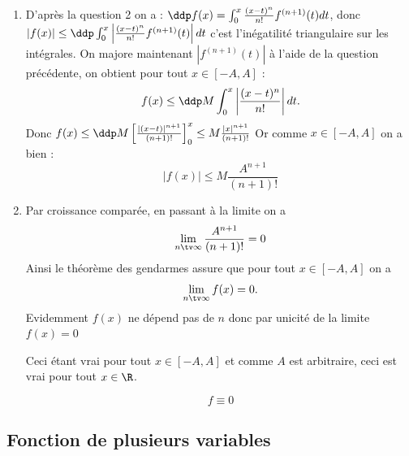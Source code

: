 \begin{correction}
\begin{enumerate}
\begin{enumerate}
\item  D'après la question 2 on a : 
$\ddp f(x) = \int_0^x \frac{(x-t)^n}{n!} f^{(n+1)} (t) dt$, donc $|f(x)| \leq\ddp   \int_0^x \left|  \frac{(x-t)^n}{n!} f^{(n+1)} (t) \right| dt$ c'est l'inégatilité triangulaire sur les intégrales. On majore maintenant $\left|  f^{(n+1)} (t) \right| $ à l'aide de la question précédente, on obtient pour tout $x\in [-A,A]$ :
$$f(x) \leq  \ddp M  \int_0^x \left|  \frac{(x-t)^n}{n!}  \right| dt.$$
Donc $f(x) \leq \ddp M \left[ \frac{|(x-t)|^{n+1}}{(n+1)!}\right]_0^x \leq M  \frac{|x|^{n+1}}{(n+1)!}$ Or comme $x\in [-A,A]$ on a bien : 
$$|f(x)|\leq M\frac{A^{n+1}}{(n+1)!}$$
\item Par croissance comparée, en passant à la limite on a $$\lim_{n\tv \infty} \frac{A^{n+1}}{(n+1)!} = 0$$
Ainsi le théorème des gendarmes assure que pour tout $x\in [-A,A]$ on a 
$$\lim_{n\tv \infty} f(x) = 0.$$ Evidemment $f(x) $ ne dépend pas de $n$ donc par unicité de la limite $f(x) = 0$

Ceci étant vrai pour tout $x \in [-A,A]$ et comme $A$ est arbitraire, ceci est vrai pour tout $x \in \R$. 

$$f\equiv 0$$

\end{enumerate}

\end{enumerate}

\end{correction}


\subsection{Fonction de plusieurs variables}

